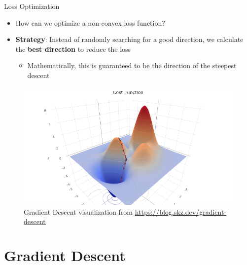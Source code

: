 \documentclass[serif, aspectratio=169]{beamer}
\begin{document}
\begin{frame}{Loss Optimization}
    \begin{minipage}{0.5\linewidth}
    \begin{itemize}
        \item How can we optimize a non-convex loss function?
        \item \textbf{Strategy}: Instead of randomly searching for a good direction, we calculate the \textbf{best direction} to reduce the loss
        \begin{itemize}
            \item  Mathematically, this is guaranteed to be the direction of the steepest descent
        \end{itemize}
    \end{itemize}
    \end{minipage}%
    \begin{minipage}{0.5\linewidth}
        \begin{figure}[h]
            \centering
            \includegraphics[height=.6\textheight]{pic/gradient_descent_blog.skz.dev.png}
            \caption{\footnotesize Gradient Descent visualization from \url{https://blog.skz.dev/gradient-descent}}
        \end{figure}
    \end{minipage}
\end{frame}


\section{Gradient Descent}
\end{document}
